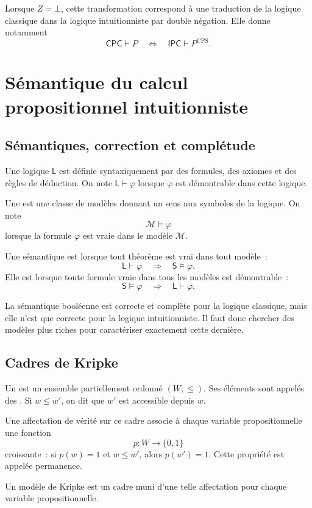 Lorsque $Z=\bot$, cette transformation correspond à une traduction de
la logique classique dans la logique intuitionniste par double
négation. Elle donne notamment
\[
\mathsf{CPC}\vdash P
\quad\Longleftrightarrow\quad
\mathsf{IPC}\vdash P^{\mathrm{CPS}}.
\]

\section{Sémantique du calcul propositionnel intuitionniste}

\subsection{Sémantiques, correction et complétude}

\thingy Une logique $\mathsf{L}$ est définie syntaxiquement par des
formules, des axiomes et des règles de déduction. On note
$\mathsf{L}\vdash\varphi$ lorsque $\varphi$ est démontrable dans cette
logique.

Une  est une classe de modèles donnant un sens aux
symboles de la logique. On note
\[
\mathcal{M}\vDash\varphi
\]
lorsque la formule $\varphi$ est vraie dans le modèle $\mathcal{M}$.

Une sémantique est  lorsque tout théorème est vrai dans
tout modèle :
\[
\mathsf{L}\vdash\varphi
\quad\Longrightarrow\quad
\mathsf{S}\vDash\varphi.
\]
Elle est  lorsque toute formule vraie dans tous les
modèles est démontrable :
\[
\mathsf{S}\vDash\varphi
\quad\Longrightarrow\quad
\mathsf{L}\vdash\varphi.
\]

La sémantique booléenne est correcte et complète pour la logique
classique, mais elle n'est que correcte pour la logique
intuitionniste. Il faut donc chercher des modèles plus riches pour
caractériser exactement cette dernière.

\subsection{Cadres de Kripke}

\begin{defn}
Un  est un ensemble partiellement ordonné
$(W,\leq)$. Ses éléments sont appelés des . Si
$w\leq w'$, on dit que $w'$ est accessible depuis $w$.

Une affectation de vérité sur ce cadre associe à chaque variable
propositionnelle une fonction
\[
p:W\to\{0,1\}
\]
croissante : si $p(w)=1$ et $w\leq w'$, alors $p(w')=1$. Cette
propriété est appelée permanence.

Un modèle de Kripke est un cadre muni d'une telle affectation pour
chaque variable propositionnelle.
\end{defn}

